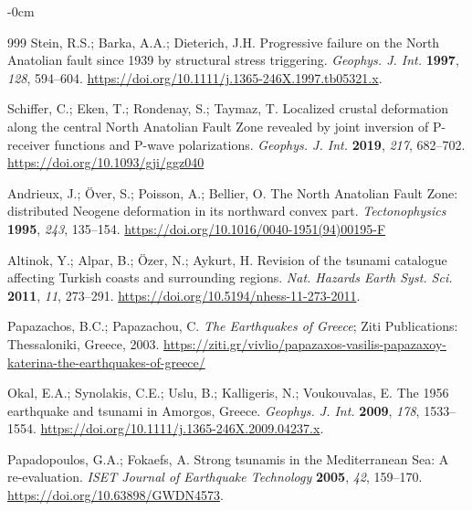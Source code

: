 \documentclass[data,article,accept,pdftex,moreauthors]{Definitions/mdpi}
\begin{document}
\begin{adjustwidth}{-\extralength}{0cm}
\begin{thebibliography}{999}
Stein, R.S.; Barka, A.A.; Dieterich, J.H. Progressive failure on the North Anatolian fault since 1939 by structural stress triggering. \emph{Geophys. J. Int.} \textbf{1997}, \emph{128}, 594--604. \url{https://doi.org/10.1111/j.1365-246X.1997.tb05321.x}.

Schiffer, C.; Eken, T.; Rondenay, S.; Taymaz, T. Localized crustal deformation along the central North Anatolian Fault Zone revealed by joint inversion of P-receiver functions and P-wave polarizations. \emph{Geophys. J. Int.} \textbf{2019}, \emph{217}, 682--702. \url{https://doi.org/10.1093/gji/ggz040}

Andrieux, J.; {\"O}ver, S.; Poisson, A.; Bellier, O. The North Anatolian Fault Zone: distributed Neogene deformation in its northward convex part. \emph{Tectonophysics} \textbf{1995}, \emph{243}, 135--154. \url{https://doi.org/10.1016/0040-1951(94)00195-F}

Altinok, Y.; Alpar, B.; Özer, N.; Aykurt, H. Revision of the tsunami catalogue affecting Turkish coasts and surrounding regions. \emph{Nat. Hazards Earth Syst. Sci.} \textbf{2011}, \emph{11}, 273--291. \url{https://doi.org/10.5194/nhess-11-273-2011}.

Papazachos, B.C.; Papazachou, C. \emph{The Earthquakes of Greece}; Ziti Publications: Thessaloniki, Greece, 2003. \url{https://ziti.gr/vivlio/papazaxos-vasilis-papazaxoy-katerina-the-earthquakes-of-greece/}

Okal, E.A.; Synolakis, C.E.; Uslu, B.; Kalligeris, N.; Voukouvalas, E. The 1956 earthquake and tsunami in Amorgos, Greece. \emph{Geophys. J. Int.} \textbf{2009}, \emph{178}, 1533--1554. \url{https://doi.org/10.1111/j.1365-246X.2009.04237.x}.

Papadopoulos, G.A.; Fokaefs, A. Strong tsunamis in the Mediterranean Sea: A re-evaluation. \emph{ISET Journal of Earthquake Technology} \textbf{2005}, \emph{42}, 159--170. \url{https://doi.org/10.63898/GWDN4573}. %


\end{thebibliography}
\end{adjustwidth}
\end{document}
